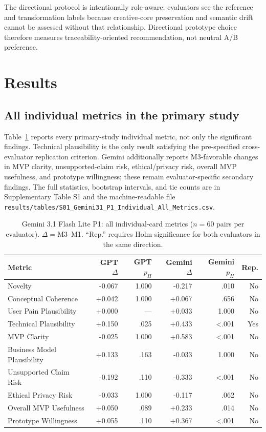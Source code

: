 \documentclass[11pt]{article}
\begin{document}
The directional protocol is intentionally role-aware: evaluators see the reference
and transformation labels because creative-core preservation and semantic drift cannot
be assessed without that relationship. Directional prototype choice therefore measures
traceability-oriented recommendation, not neutral A/B preference.

\section{Results}
\subsection{All individual metrics in the primary study}
Table~\ref{tab:individualall} reports every primary-study individual metric, not only
the significant findings. Technical plausibility is the only result satisfying the
pre-specified cross-evaluator replication criterion. Gemini additionally reports
M3-favorable changes in MVP clarity, unsupported-claim risk, ethical/privacy risk,
overall MVP usefulness, and prototype willingness; these remain evaluator-specific
secondary findings. The full statistics, bootstrap intervals, and tie counts are in
Supplementary Table S1 and the machine-readable file
\texttt{results/tables/S01\_Gemini31\_P1\_Individual\_All\_Metrics.csv}.

\begin{table}[htbp]\centering\scriptsize
\caption{Gemini 3.1 Flash Lite P1: all individual-card metrics ($n=60$ pairs per evaluator). $\Delta=$M3--M1. ``Rep.'' requires Holm significance for both evaluators in the same direction.}
\label{tab:individualall}
\begin{tabular}{lrrrrr}
\toprule
Metric & GPT $\Delta$ & GPT $p_H$ & Gemini $\Delta$ & Gemini $p_H$ & Rep.\\
\midrule
Novelty & -0.067 & 1.000 & -0.217 & .010 & No \\
Conceptual Coherence & +0.042 & 1.000 & +0.067 & .656 & No \\
User Pain Plausibility & +0.000 & — & +0.033 & 1.000 & No \\
Technical Plausibility & +0.150 & .025 & +0.433 & <.001 & Yes \\
MVP Clarity & -0.025 & 1.000 & +0.583 & <.001 & No \\
Business Model Plausibility & +0.133 & .163 & -0.033 & 1.000 & No \\
Unsupported Claim Risk & -0.192 & .110 & -0.333 & <.001 & No \\
Ethical Privacy Risk & -0.033 & 1.000 & -0.117 & .062 & No \\
Overall MVP Usefulness & +0.050 & .089 & +0.233 & .014 & No \\
Prototype Willingness & +0.055 & .110 & +0.367 & <.001 & No \\
\bottomrule
\end{tabular}
\end{table}
\end{document}
